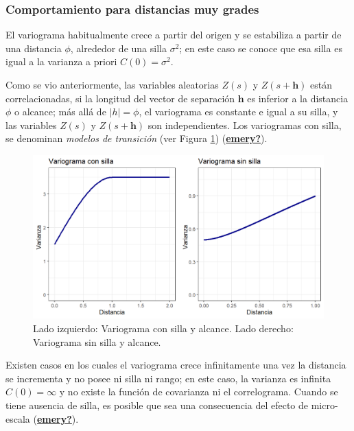\documentclass[
]{book}
\begin{document}
\hypertarget{comportamiento-para-distancias-muy-grades}{%
\subsubsection*{Comportamiento para distancias muy grades}\label{comportamiento-para-distancias-muy-grades}}

El variograma habitualmente crece a partir del origen y se estabiliza a partir de una distancia \(\phi\), alrededor de una silla \(\sigma^2\); en este caso se conoce que esa silla es igual a la varianza a priori \(C(0)=\sigma^2\).

Como se vio anteriormente, las variables aleatorias \(Z(s)\) y \(Z(s+\textbf{h})\) están correlacionadas, si la longitud del vector de separación \(\textbf{h}\) es inferior a la distancia \(\phi\) o alcance; más allá de \(|h|=\phi\), el variograma es constante e igual a su silla, y las variables \(Z(s)\) y \(Z(s+\textbf{h})\) son independientes. Los variogramas con silla, se denominan \textit{modelos de transición} (ver Figura \ref{fig:varsill}) (\protect\hyperlink{ref-emery}{\textbf{emery?}}).

\begin{figure}
\includegraphics[width=17.78in]{figuras/otros/vari_sill} \caption{Lado izquierdo: Variograma con silla y alcance. Lado derecho: Variograma sin silla y  alcance.}\label{fig:varsill}
\end{figure}

Existen casos en los cuales el variograma crece infinitamente una vez la distancia se incrementa y no posee ni silla ni rango; en este caso, la varianza es infinita \(C(0)=\infty\) y no existe la función de covarianza ni el correlograma. Cuando se tiene ausencia de silla, es posible que sea una consecuencia del efecto de micro-escala (\protect\hyperlink{ref-emery}{\textbf{emery?}}).
\end{document}
